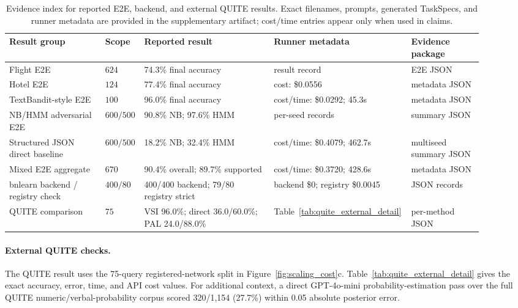 \documentclass{article}
\newcommand{\taskspec}{TaskSpec}
\begin{document}
\begin{table}[ht]
\centering
\scriptsize
\setlength{\tabcolsep}{2.5pt}
\caption{Evidence index for reported E2E, backend, and external QUITE results. Exact filenames, prompts, generated \taskspec{}s, and runner metadata are provided in the supplementary artifact; cost/time entries appear only when used in claims.}
\label{tab:e2e_artifacts}
\begin{tabular}{@{}p{0.20\linewidth}p{0.08\linewidth}p{0.27\linewidth}p{0.20\linewidth}p{0.15\linewidth}@{}}
\toprule
Result group & Scope & Reported result & Runner metadata & Evidence package \\
\midrule
Flight E2E & $624$ & 74.3\% final accuracy & result record & E2E JSON \\
Hotel E2E & $124$ & 77.4\% final accuracy & cost: \$0.0556 & metadata JSON \\
TextBandit-style E2E & $100$ & 96.0\% final accuracy & cost/time: \$0.0292; 45.3s & metadata JSON \\
NB/HMM adversarial E2E & $600/500$ & 90.8\% NB; 97.6\% HMM & per-seed records & summary JSON \\
Structured JSON direct baseline & $600/500$ & 18.2\% NB; 32.4\% HMM & cost/time: \$0.4079; 462.7s & multiseed summary JSON \\
Mixed E2E aggregate & $670$ & 90.4\% overall; 89.7\% supported & cost/time: \$0.3720; 428.6s & metadata JSON \\
bnlearn backend / registry check & $400/80$ & 400/400 backend; 79/80 registry strict & backend \$0; registry \$0.0045 & JSON records \\
QUITE comparison & $75$ & VSI 96.0\%; direct 36.0/60.0\%; PAL 24.0/88.0\% & Table~\ref{tab:quite_external_detail} & per-method JSON \\
\bottomrule
\end{tabular}
\end{table}

\paragraph{External QUITE checks.}
The QUITE result uses the 75-query registered-network split in Figure~\ref{fig:scaling_cost}c.
Table~\ref{tab:quite_external_detail} gives the exact accuracy, error, time, and API cost values.
For additional context, a direct GPT-4o-mini probability-estimation pass over the full QUITE numeric/verbal-probability corpus scored 320/1,154 (27.7\%) within 0.05 absolute posterior error.
\end{document}

